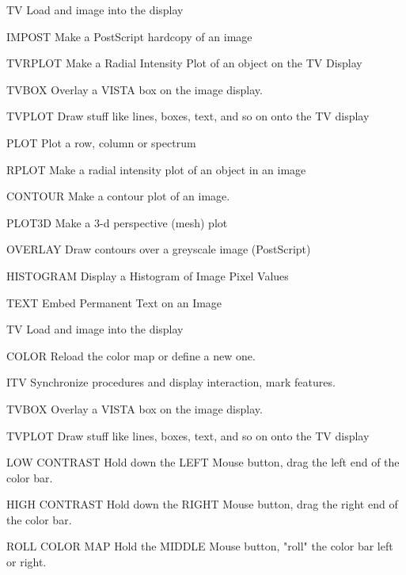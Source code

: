 {\newpage\clearpage
{}%
\begin{example} 
  \item[TV\hfill]{Load and image into the display}
  \item[IMPOST\hfill]{Make a PostScript hardcopy of an image}
  \item[TVRPLOT\hfill]{Make a Radial Intensity Plot of an object on the 
       TV Display}
  \item[TVBOX\hfill]{Overlay a VISTA box on the image display.}
  \item[TVPLOT \hfill]{Draw stuff like lines, boxes, text, and so on onto the 
       TV display}
  \item[PLOT\hfill]{Plot a row, column or spectrum}
  \item[RPLOT\hfill]{Make a radial intensity plot of an object in an image}
  \item[CONTOUR\hfill]{Make a contour plot of an image.}
  \item[PLOT3D\hfill]{Make a 3-d perspective (mesh) plot}
  \item[OVERLAY\hfill]{Draw contours over a greyscale image (PostScript)}
  \item[HISTOGRAM\hfill]{Display a Histogram of Image Pixel Values}
  \item[TEXT\hfill]{Embed Permanent Text on an Image}
\end{example}%
\lthtmlfigureZ
\lthtmlcheckvsize\clearpage}

{\newpage\clearpage
{}%
\begin{example} 
  \item[TV\hfill]{Load and image into the display}
  \item[COLOR\hfill]{Reload the color map or define a new one.}
  \item[ITV\hfill]{Synchronize procedures and display interaction, mark
       features.}
  \item[TVBOX\hfill]{Overlay a VISTA box on the image display.}
  \item[TVPLOT \hfill]{Draw stuff like lines, boxes, text, and so on onto the 
       TV display}
\end{example}%
\lthtmlfigureZ
\lthtmlcheckvsize\clearpage}

{\newpage\clearpage
{}%
\begin{example}
  \item[LOW CONTRAST]{Hold down the LEFT Mouse button, drag the left
       end of the color bar.}
\par\item[HIGH CONTRAST]{Hold down the RIGHT Mouse button, drag the right
       end of the color bar.}
\par\item[ROLL COLOR MAP]{Hold the MIDDLE Mouse button, "roll" the
       color bar left or right.}
\end{example}%
\lthtmlfigureZ
\lthtmlcheckvsize\clearpage}


